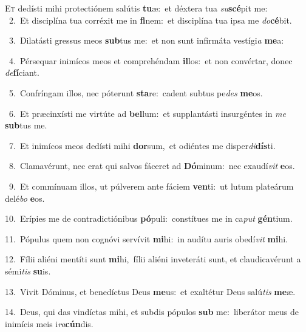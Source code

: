 \lettrine{\initial\textcolor{\initialcolor}{E}}{t} dedísti mihi protectiónem salútis \textbf{tu}\-æ:~\star et déxtera tua \textit{su}\-\textbf{scé}pit me:\\
{\numbfont\textcolor{\numbcolor}{~2.}}~Et disciplína tua corréxit me in \textbf{fi}\-nem:~\star et disciplína tua ipsa me \textit{do}\-\textbf{cé}bit.\par
{\numbfont\textcolor{\numbcolor}{~3.}}~Dilatásti gressus meos \textbf{sub}\-tus me:~\star et non sunt infirmáta vestígi\textit{a} \textbf{me}\-a:\par
{\numbfont\textcolor{\numbcolor}{~4.}}~Pérsequar inimícos meos et comprehéndam \textbf{il}\-los:~\star et non convértar, donec \textit{de}\-\textbf{fí}ciant.\par
{\numbfont\textcolor{\numbcolor}{~5.}}~Confríngam illos, nec póterunt \textbf{sta}\-re:~\star cadent subtus pe\textit{des} \textbf{me}\-os.\par
{\numbfont\textcolor{\numbcolor}{~6.}}~Et præcinxísti me virtúte ad \textbf{bel}\-lum:~\star et supplantásti insurgéntes in \textit{me} \textbf{sub}\-tus me.\par
{\numbfont\textcolor{\numbcolor}{~7.}}~Et inimícos meos dedísti mihi \textbf{dor}\-sum,~\star et odiéntes me disper\-\textit{di}\-\textbf{dís}ti.\par
{\numbfont\textcolor{\numbcolor}{~8.}}~Clamavérunt, nec erat qui salvos fáceret ad \textbf{Dó}\-minum:~\star nec exaudí\textit{vit} \textbf{e}\-os.\par
{\numbfont\textcolor{\numbcolor}{~9.}}~Et commínuam illos, ut púlverem ante fáciem \textbf{ven}\-ti:~\star ut lutum plateárum delé\textit{bo} \textbf{e}\-os.\par
{\numbfont\textcolor{\numbcolor}{10.}}~Erípies me de contradictiónibus \textbf{pó}\-puli:~\star constítues me in ca\textit{put} \textbf{gén}\-tium.\par
{\numbfont\textcolor{\numbcolor}{11.}}~Pópulus quem non cognóvi servívit \textbf{mi}\-hi:~\star in audítu auris obedí\textit{vit} \textbf{mi}\-hi.\par
{\numbfont\textcolor{\numbcolor}{12.}}~Fílii aliéni mentíti sunt \textbf{mi}\-hi,~\star fílii aliéni inveteráti sunt, et claudicavérunt a sémi\textit{tis} \textbf{su}\-is.\par
{\numbfont\textcolor{\numbcolor}{13.}}~Vivit Dóminus, et benedíctus Deus \textbf{me}\-us:~\star et exaltétur Deus salú\textit{tis} \textbf{me}\-æ.\par
{\numbfont\textcolor{\numbcolor}{14.}}~Deus, qui das vindíctas mihi, et subdis pópulos \textbf{sub} me:~\star liberátor meus de inimícis meis i\-\textit{ra}\-\textbf{cún}dis.\par
